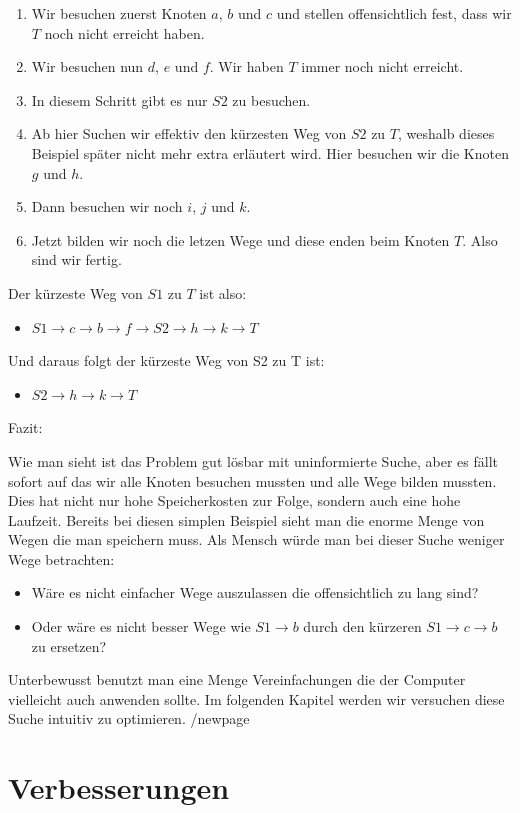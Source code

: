 \begin{enumerate}
	\item Wir besuchen zuerst Knoten $a$, $b$ und $c$ und stellen offensichtlich fest, dass wir $T$ noch nicht erreicht haben. 
	\item Wir besuchen nun $d$, $e$ und $f$. Wir haben $T$ immer noch nicht erreicht.
	\item In diesem Schritt gibt es nur $S2$ zu besuchen. 
	\item Ab hier Suchen wir effektiv den k\"urzesten Weg von $S2$ zu $T$, weshalb dieses Beispiel sp\"ater nicht mehr extra erl\"autert wird. Hier besuchen wir die Knoten $g$ und $h$.
	\item Dann besuchen wir noch $i$, $j$ und $k$.
	\item Jetzt bilden wir noch die letzen Wege und diese enden beim Knoten $T$. Also sind wir fertig. 
\end{enumerate}
Der k\"urzeste Weg von $S1$ zu $T$ ist also:
\begin{itemize}
	\item  $S1\rightarrow c\rightarrow b\rightarrow f\rightarrow S2\rightarrow h\rightarrow k\rightarrow T$
\end{itemize}
Und daraus folgt der k\"urzeste Weg von S2 zu T ist: 
\begin{itemize}
	\item $S2\rightarrow h\rightarrow k\rightarrow T$
\end{itemize}
Fazit:

Wie man sieht ist das Problem gut l\"osbar mit uninformierte Suche, aber es f\"allt sofort auf das wir alle Knoten besuchen mussten und alle Wege bilden mussten.
Dies hat nicht nur hohe Speicherkosten zur Folge, sondern auch eine hohe Laufzeit. 
Bereits bei diesen simplen Beispiel sieht man die enorme Menge von Wegen die man speichern muss. 
Als Mensch w\"urde man bei dieser Suche weniger Wege betrachten:
\begin{itemize}
	\item W\"are es nicht einfacher Wege auszulassen die offensichtlich zu lang sind?
	\item Oder w\"are es nicht besser Wege wie $S1\rightarrow b$ durch den k\"urzeren $S1\rightarrow c\rightarrow b$ zu ersetzen?
\end{itemize}
Unterbewusst benutzt man eine Menge Vereinfachungen die der Computer vielleicht auch anwenden sollte. 
Im folgenden Kapitel werden wir versuchen diese Suche intuitiv zu optimieren. /newpage

\section{Verbesserungen}
